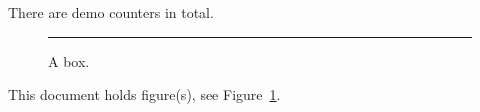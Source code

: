 \documentclass{article}
\begin{document}
\setcounter{smokefig}{3}
There are  demo counters in total.
\begin{figure}[ht]
\centering\rule{2cm}{1cm}
\caption{A box.\label{fig:tc}}
\end{figure}
This document holds  figure(s), see Figure~\ref{fig:tc}.
\end{document}
